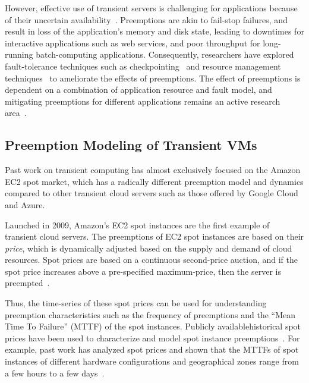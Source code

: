 However, effective use of transient servers is challenging for applications because of their uncertain availability~\cite{spotcheck, prateek-thesis}. 
Preemptions are akin to fail-stop failures, and result in loss of the application's memory and disk state, leading to downtimes for interactive applications such as web services, and poor throughput for long-running batch-computing applications. 
Consequently, researchers have explored fault-tolerance techniques such as checkpointing~\cite{flint, marathe2014exploiting, spoton} and resource management techniques~\cite{exosphere} to ameliorate the effects of preemptions. %
The effect of preemptions is dependent on a combination of application resource and fault model, and mitigating preemptions for different applications remains an active research area~\cite{hourglass-eurosys19}.




\subsection{Preemption Modeling of Transient VMs}


Past work on transient computing has almost exclusively focused on the Amazon EC2 spot market, which has a radically different preemption model and dynamics compared to other transient cloud servers such as those offered by Google Cloud and Azure. 

Launched in 2009, Amazon's EC2 spot instances are the first example of transient cloud servers.
The preemptions of EC2 spot instances are based on their \emph{price}, which is dynamically adjusted based on the supply and demand of cloud resources.
Spot prices are based on a continuous second-price auction, and if the spot price increases above a pre-specified maximum-price, then the server is preempted~\cite{spot-pricing2}.

Thus, the time-series of these spot prices can be used for understanding preemption characteristics such as the frequency of preemptions and the ``Mean Time To Failure'' (MTTF) of the spot instances. 
Publicly available\footnotemark historical spot prices have been used to characterize and model spot instance preemptions~\cite{spotcheck,bid-cloud}. %
For example, past work has analyzed spot prices and shown that the MTTFs of spot instances of different hardware configurations and geographical zones range from a few hours to a few days~\cite{prateek-thesis, wolski_probabilistic_2017, icdcs-spotlight}.

